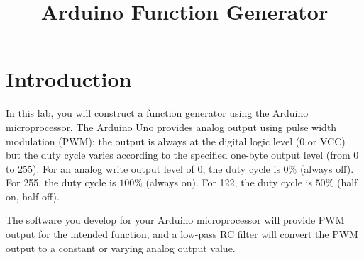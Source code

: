 \documentclass[12pt]{article}
\begin{document}
\title{Arduino Function Generator} 

\maketitle

\section{Introduction}

In this lab, you will construct a function generator using the Arduino
microprocessor.  The Arduino Uno provides analog output using pulse
width modulation (PWM):  the output is always at the digital logic level (0
or VCC) but the duty cycle varies according to the specified one-byte
output level (from 0 to 255).  For an analog write output level of 0,
the duty cycle is $0\%$ (always off).  For 255, the duty cycle is
$100\%$ (always on).  For 122, the duty cycle is $50\%$ (half on, half
off).

The software you develop for your Arduino microprocessor will provide 
PWM output for the intended function, and a low-pass RC filter will convert 
the PWM output to a constant or varying analog output value.
\end{document}
